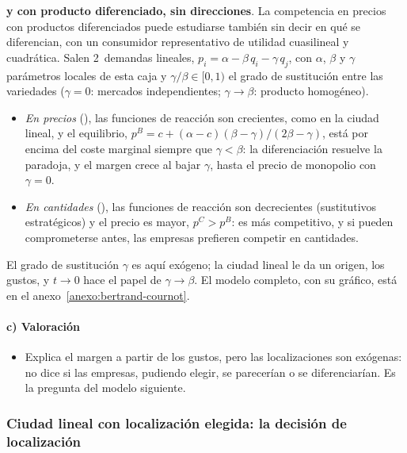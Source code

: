 \documentclass[11pt]{article}
\begin{document}
\begin{anotaciones}
\textbf{ y  con producto diferenciado, sin direcciones}. La competencia en precios con productos diferenciados puede estudiarse también sin decir en qué se diferencian, con un consumidor representativo de utilidad cuasilineal y cuadrática\nocite{SinghVives1984Price,Bowley1924Mathematical}. Salen 2~demandas lineales, $p_i=\alpha-\beta\,q_i-\gamma\,q_j$, con $\alpha$, $\beta$ y $\gamma$ parámetros locales de esta caja y $\gamma/\beta\in[0,1)$ el grado de sustitución entre las variedades ($\gamma=0$: mercados independientes; $\gamma\to\beta$: producto homogéneo).
\begin{itemize}
\item \emph{En precios} (), las funciones de reacción son crecientes, como en la ciudad lineal, y el equilibrio, $p^B=c+(\alpha-c)(\beta-\gamma)/(2\beta-\gamma)$, está por encima del coste marginal siempre que $\gamma<\beta$: la diferenciación resuelve la paradoja, y el margen crece al bajar $\gamma$, hasta el precio de monopolio con $\gamma=0$.
\item \emph{En cantidades} (), las funciones de reacción son decrecientes (sustitutivos estratégicos) y el precio es mayor, $p^C>p^B$:  es más competitivo, y si pueden comprometerse antes, las empresas prefieren competir en cantidades.
\end{itemize}
El grado de sustitución $\gamma$ es aquí exógeno; la ciudad lineal le da un origen, los gustos, y $t\to0$ hace el papel de $\gamma\to\beta$. El modelo completo, con su gráfico, está en el anexo~\ref{anexo:bertrand-cournot}.
\end{anotaciones}

\paragraph{c) Valoración}

\begin{itemize}
\item Explica el margen a partir de los gustos, pero las localizaciones son exógenas: no dice si las empresas, pudiendo elegir, se parecerían o se diferenciarían. Es la pregunta del modelo siguiente.
\end{itemize}

\subsubsection{Ciudad lineal con localización elegida: la decisión de localización}\label{sec:hotelling-localizacion}
\end{document}
